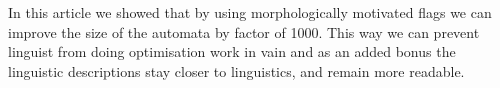 \documentclass[11pt]{article}
\begin{document}
In this article we showed that by using morphologically motivated flags we can
improve the size of the automata by factor of 1000. This way we can prevent
linguist from doing optimisation work in vain and as an added bonus the
linguistic descriptions stay closer to linguistics, and remain more readable.

\end{document}
